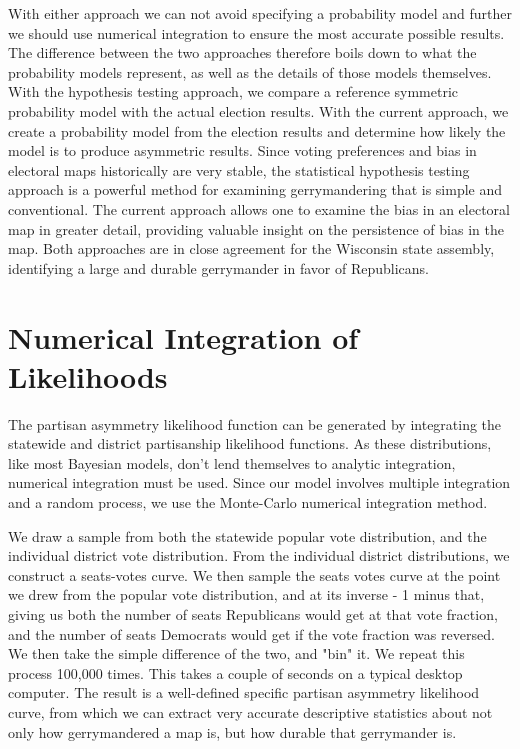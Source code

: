 \documentclass[preprint,12pt]{article}
\begin{document}
With either approach we can not avoid specifying a probability model and further we should use numerical integration to ensure the most accurate possible results. The difference between the two approaches therefore boils down to what the probability models represent, as well as the details of those models themselves. With the hypothesis testing approach, we compare a reference symmetric probability model with the actual election results. With the current approach, we create a probability model from the election results and determine how likely the model is to produce asymmetric results. Since voting preferences and bias in electoral maps historically are very stable, the statistical hypothesis testing approach is a powerful method for examining gerrymandering that is simple and conventional. The current approach allows one to examine the bias in an electoral map in greater detail, providing valuable insight on the persistence of bias in the map. Both approaches are in close agreement for the Wisconsin state assembly, identifying a large and durable gerrymander in favor of Republicans.
 
\section{Numerical Integration of Likelihoods}
 
The partisan asymmetry likelihood function can be generated by integrating the statewide and district partisanship likelihood functions.  As these distributions, like most Bayesian models, don't lend themselves to analytic integration, numerical integration must be used. Since our model involves multiple integration and a random process, we use the Monte-Carlo numerical integration method.
 
We draw a sample from both the statewide popular vote distribution, and the individual district vote distribution.   From the individual district distributions, we construct a seats-votes curve.  We then sample the seats votes curve at the point we drew from the popular vote distribution, and at its inverse - 1 minus that, giving us both the number of seats Republicans would get at that vote fraction, and the number of seats Democrats would get if the vote fraction was reversed.  We then take the simple difference of the two, and "bin" it.  We repeat this process 100,000 times.  This takes a couple of seconds on a typical desktop computer.  The result is a well-defined specific partisan asymmetry likelihood curve, from which we can extract very accurate descriptive statistics about not only how gerrymandered a map is, but how durable that gerrymander is.
\end{document}
